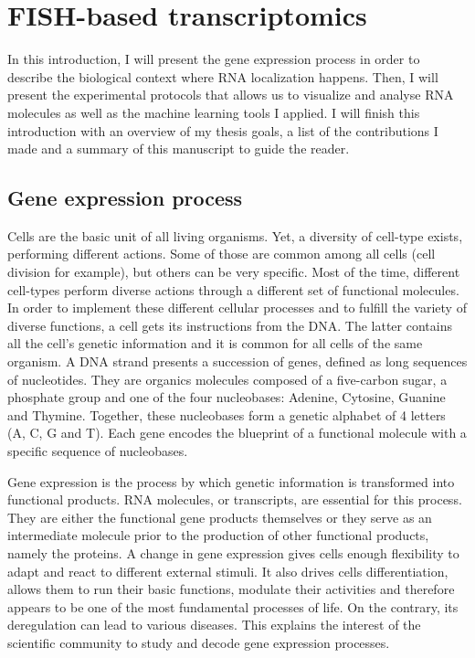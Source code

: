 
\graphicspath{{./figures/introduction/}}

\chapter{FISH-based transcriptomics}
\label{ch:introduction}

\minitoc
\newpage

In this introduction, I will present the gene expression process in order to describe the biological context where \ac{RNA} localization happens.
Then, I will present the experimental protocols that allows us to visualize and analyse \ac{RNA} molecules as well as the machine learning tools I applied.
I will finish this introduction with an overview of my thesis goals, a list of the contributions I made and a summary of this manuscript to guide the reader.

\section{Gene expression process}
\label{sec:gene_expression}

Cells are the basic unit of all living organisms.
Yet, a diversity of cell-type exists, performing different actions.
Some of those are common among all cells (cell division for example), but others can be very specific.
Most of the time, different cell-types perform diverse actions through a different set of functional molecules.
In order to implement these different cellular processes and to fulfill the variety of diverse functions, a cell gets its instructions from the \ac{DNA}.
The latter contains all the cell's genetic information and it is common for all cells of the same organism.
A \ac{DNA} strand presents a succession of genes, defined as long sequences of nucleotides.
They are organics molecules composed of a five-carbon sugar, a phosphate group and one of the four nucleobases: Adenine, Cytosine, Guanine and Thymine.
Together, these nucleobases form a genetic alphabet of 4 letters (A, C, G and  T).
Each gene encodes the blueprint of a functional molecule with a specific sequence of nucleobases.

Gene expression is the process by which genetic information is transformed into functional products.
\ac{RNA} molecules, or transcripts, are essential for this process.
They are either the functional gene products themselves or they serve as an intermediate molecule prior to the production of other functional products, namely the proteins.
A change in gene expression gives cells enough flexibility to adapt and react to different external stimuli.
It also drives cells differentiation, allows them to run their basic functions, modulate their activities and therefore appears to be one of the most fundamental processes of life.
On the contrary, its deregulation can lead to various diseases.
This explains the interest of the scientific community to study and decode gene expression processes.

